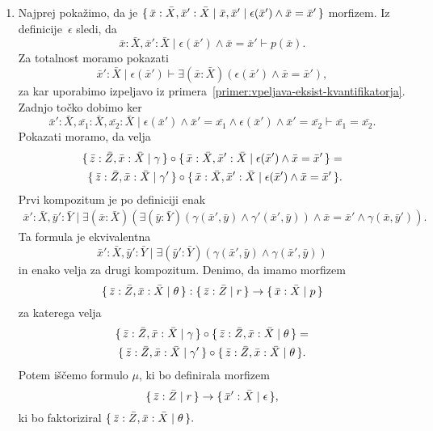 \documentclass[../kategoricna_logika.tex]{subfiles}
\begin{document}
\begin{dokaz}
\begin{enumerate}[label=(\roman*)]
  \item Najprej pokažimo, da je
    $\lbrace\,\bar{x}:\bar{X}, \bar{x}':\bar{X} \mid \bar{x},\bar{x}' \mid \epsilon(\bar{x}') \land \bar{x} = \bar{x}'\,\rbrace$
    morfizem.  Iz
    definicije~$\epsilon$ sledi, da
    $$\bar{x}:\bar{X}, \bar{x}':\bar{X} \mid \epsilon(\bar{x}') \land \bar{x} = \bar{x}' \vdash p(\bar{x}).$$
    Za totalnost moramo pokazati
    \[\bar{x}':\bar{X} \mid \epsilon(\bar{x}') \vdash \exists (\bar{x}:\bar{X}) (\epsilon(\bar{x}') \land \bar{x}=\bar{x}'),\]
    za kar uporabimo izpeljavo iz primera~\ref{primer:vpeljava-eksist-kvantifikatorja}.
    Zadnjo točko dobimo ker
    \[\bar{x}':\bar{X},\bar{x_1}:\bar{X},\bar{x_2}:\bar{X} \mid \epsilon(\bar{x}') \land \bar{x}'=\bar{x_1} \land \epsilon(\bar{x}') \land \bar{x}'= \bar{x_2}
      \vdash \bar{x_1} = \bar{x_2}.\]
    Pokazati moramo, da velja
\begin{align*}
    \lbrace\,\bar{z}:\bar{Z},\bar{x}:\bar{X} \mid \gamma\,\rbrace \circ
  \lbrace\,\bar{x}:\bar{X},\bar{x}':\bar{X} \mid \epsilon(\bar{x}') \land \bar{x} = \bar{x}'\,\rbrace = \\
  \lbrace\,\bar{z}:\bar{Z},\bar{x}:\bar{X} \mid \gamma'\,\rbrace
  \circ \lbrace\,\bar{x}:\bar{X},\bar{x}':\bar{X} \mid \epsilon(\bar{x}') \land \bar{x} = \bar{x}'\,\rbrace.
  \end{align*}
    Prvi kompozitum je po
    definiciji enak
\begin{align*}
    \bar{x}':\bar{X},\bar{y}':\bar{Y} \mid \exists (\bar{x}:\bar{X})( \exists (\bar{y}:\bar{Y})(\gamma(\bar{x}',\bar{y}) \land \gamma'(\bar{x}',\bar{y})) \land \bar{x} = \bar{x}' \land \gamma(\bar{x},\bar{y}')).
  \end{align*}
  Ta formula je
  ekvivalentna
  $$\bar{x}':\bar{X},\bar{y}':\bar{Y} \mid \exists (\bar{y}':\bar{Y})(\gamma(\bar{x}',\bar{y}) \land \gamma(\bar{x}',\bar{y}))$$
  in enako velja za drugi kompozitum.  Denimo, da imamo morfizem
    \[\lbrace\,\bar{z}:\bar{Z},\bar{x}:\bar{X} \mid \theta\,\rbrace : \lbrace\,\bar{z}:\bar{Z} \mid r\,\rbrace \to \lbrace\,\bar{x}:\bar{X} \mid p\,\rbrace\]
    za katerega velja
\begin{multline*}
    \lbrace\,\bar{z}:\bar{Z},\bar{x}:\bar{X} \mid \gamma\,\rbrace \circ \lbrace\,\bar{z}:\bar{Z},\bar{x}:\bar{X} \mid \theta\,\rbrace =\\
    \lbrace\,\bar{z}:\bar{Z},\bar{x}:\bar{X} \mid \gamma'\,\rbrace \circ
    \lbrace\,\bar{z}:\bar{Z},\bar{x}:\bar{X} \mid \theta\,\rbrace.
    \end{multline*}
    Potem iščemo formulo $\mu$, ki bo definirala
    morfizem
    $$\lbrace\,\bar{z}:\bar{Z} \mid r\,\rbrace \to \lbrace\,\bar{x}':\bar{X} \mid \epsilon\,\rbrace,$$
    ki bo
    faktoriziral $\lbrace\,\bar{z}:\bar{Z},\bar{x}:\bar{X} \mid \theta\,\rbrace.$

\end{enumerate}
\end{dokaz}
\end{document}
